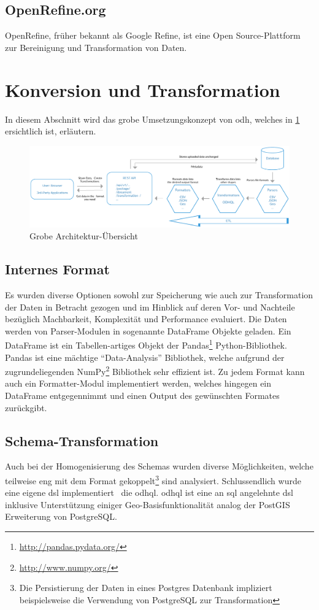 \subsection{OpenRefine.org}
OpenRefine, früher bekannt als Google Refine, ist eine Open Source-Plattform zur Bereinigung und Transformation von Daten.

\section{Konversion und Transformation}

In diesem Abschnitt wird das grobe Umsetzungskonzept von \gls{odh}, welches in \cref{fig:tb:arch-overview} ersichtlich ist, erläutern. 
\begin{figure}[H]
    \centering
    \includegraphics[width=\linewidth]{../projektdokumentation/fig/ODH-Architecture-Overview}
    \caption{Grobe Architektur-Übersicht}
    \label{fig:tb:arch-overview}
\end{figure}

\subsection{Internes Format}
Es wurden diverse Optionen sowohl zur Speicherung wie auch zur Transformation der Daten in Betracht gezogen und im Hinblick auf deren Vor- und Nachteile bezüglich Machbarkeit, Komplexität und Performance evaluiert. Die Daten werden von Parser-Modulen in sogenannte DataFrame Objekte geladen. Ein DataFrame ist ein Tabellen-artiges Objekt der Pandas\footnote{\url{http://pandas.pydata.org/}} Python-Bibliothek. Pandas ist eine mächtige ``Data-Analysis'' Bibliothek, welche aufgrund der zugrundeliegenden NumPy\footnote{\url{http://www.numpy.org/}} Bibliothek sehr effizient ist.
Zu jedem Format kann auch ein Formatter-Modul implementiert werden, welches hingegen ein DataFrame entgegennimmt und einen Output des gewünschten Formates zurückgibt.

\subsection{Schema-Transformation}
Auch bei der Homogenisierung des Schemas wurden diverse Möglichkeiten, welche teilweise eng mit dem Format gekoppelt\footnote{Die Persistierung der Daten in eines Postgres Datenbank impliziert beispielsweise die Verwendung von PostgreSQL zur Transformation} sind analysiert. Schlussendlich wurde eine eigene \gls{dsl} implementiert \textendash\ die \acf{odhql}. \acs{odhql} ist eine an \acs{sql} angelehnte \gls{dsl} inklusive Unterstützung einiger Geo-Basisfunktionalität analog der PostGIS Erweiterung von PostgreSQL.


